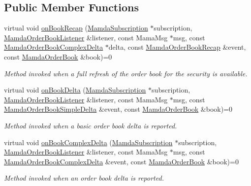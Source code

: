 \subsection*{Public Member Functions}
\begin{CompactItemize}
\item 
virtual void \hyperlink{classWombat_1_1MamdaOrderBookHandler_2c353b638002894e89b98de5991f77ad}{on\-Book\-Recap} (\hyperlink{classWombat_1_1MamdaSubscription}{Mamda\-Subscription} $\ast$subscription, \hyperlink{classWombat_1_1MamdaOrderBookListener}{Mamda\-Order\-Book\-Listener} \&listener, const Mama\-Msg $\ast$msg, const \hyperlink{classWombat_1_1MamdaOrderBookComplexDelta}{Mamda\-Order\-Book\-Complex\-Delta} $\ast$delta, const \hyperlink{classWombat_1_1MamdaOrderBookRecap}{Mamda\-Order\-Book\-Recap} \&event, const \hyperlink{classWombat_1_1MamdaOrderBook}{Mamda\-Order\-Book} \&book)=0
\begin{CompactList}\small\item\em Method invoked when a full refresh of the order book for the security is available. \item\end{CompactList}\item 
virtual void \hyperlink{classWombat_1_1MamdaOrderBookHandler_b24be779d6029bfcc87ad85f469aa89f}{on\-Book\-Delta} (\hyperlink{classWombat_1_1MamdaSubscription}{Mamda\-Subscription} $\ast$subscription, \hyperlink{classWombat_1_1MamdaOrderBookListener}{Mamda\-Order\-Book\-Listener} \&listener, const Mama\-Msg $\ast$msg, const \hyperlink{classWombat_1_1MamdaOrderBookSimpleDelta}{Mamda\-Order\-Book\-Simple\-Delta} \&event, const \hyperlink{classWombat_1_1MamdaOrderBook}{Mamda\-Order\-Book} \&book)=0
\begin{CompactList}\small\item\em Method invoked when a basic order book delta is reported. \item\end{CompactList}\item 
virtual void \hyperlink{classWombat_1_1MamdaOrderBookHandler_eaeaeb1763785a609ba8552960acce8f}{on\-Book\-Complex\-Delta} (\hyperlink{classWombat_1_1MamdaSubscription}{Mamda\-Subscription} $\ast$subscription, \hyperlink{classWombat_1_1MamdaOrderBookListener}{Mamda\-Order\-Book\-Listener} \&listener, const Mama\-Msg $\ast$msg, const \hyperlink{classWombat_1_1MamdaOrderBookComplexDelta}{Mamda\-Order\-Book\-Complex\-Delta} \&event, const \hyperlink{classWombat_1_1MamdaOrderBook}{Mamda\-Order\-Book} \&book)=0
\begin{CompactList}\small\item\em Method invoked when an order book delta is reported. \item\end{CompactList}\item 

\end{CompactItemize}
